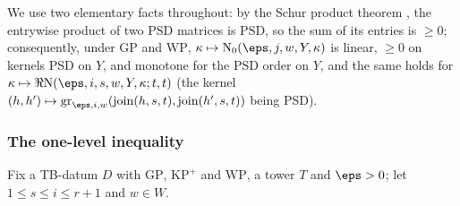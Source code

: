 We use two elementary facts throughout: by the Schur product theorem \cite[Thm.~7.5.3]{HornJohnson2013}, the entrywise
product of two PSD matrices is PSD, so the sum of its entries is $\ge0$; consequently, under $\mathrm{GP}$ and
$\mathrm{WP}$, $\kappa\mapsto\thmSNz(\eps,j,w,Y,\kappa)$ is linear, $\ge0$ on kernels PSD on $Y$, and monotone for
the PSD order on $Y$, and the same holds for $\kappa\mapsto\Re\thmSNst(\eps,i,s,w,Y,\kappa;t,t)$ (the kernel
$(h,h')\mapsto\thmSgram_{\eps,i,w}(\thmSjoin(h,s,t),\thmSjoin(h',s,t))$ being PSD).

\subsubsection{The one-level inequality}\label{sec:pf:thmS:steps}

Fix a TB-datum $D$ with $\mathrm{GP}$, $\mathrm{KP}^{+}$ and $\mathrm{WP}$, a tower $T$ and $\eps>0$; let
$1\le s\le i\le r+1$ and $w\in W$.

